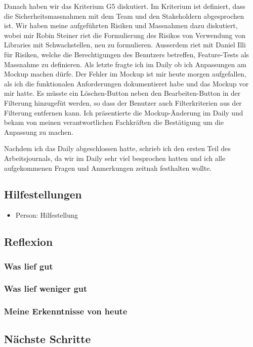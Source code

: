 Danach haben wir das Kriterium G5 diskutiert. Im Kriterium ist definiert, dass die Sicherheitsmassnahmen mit dem Team und den Stakeholdern
abgesprochen ist. Wir haben meine aufgeführten Risiken und Massnahmen dazu diskutiert, wobei mir Robin Steiner riet die Formulierung des Risikos von
Verwendung von Libraries mit Schwachstellen, neu zu formulieren. Ausserdem riet mit Daniel Illi für Risiken, welche die Berechtigungen des Benutzers betreffen,
Feature-Tests als Massnahme zu definieren. Als letzte fragte ich im Daily ob ich Anpassungen am Mockup machen dürfe. Der Fehler im Mockup ist mir heute morgen aufgefallen, 
als ich die funktionalen Anforderungen dokumentieret habe und das Mockup vor mir hatte. Es müsste ein Löschen-Button neben den Bearbeiten-Button in der Filterung hinzugefüt werden,
so dass der Benutzer auch Filterkriterien aus der Filterung entfernen kann. Ich präsentierte die Mockup-Änderung im Daily und bekam von meinen verantwortlichen Fachkräften
die Bestätigung um die Anpassung zu machen. 

Nachdem ich das Daily abgeschlossen hatte, schrieb ich den ersten Teil des Arbeitsjournals, da wir im Daily sehr viel besprochen hatten und ich
alle aufgekommenen Fragen und Anmerkungen zeitnah festhalten wollte.

\subsection*{Hilfestellungen}
\begin{itemize}
    \item Person: Hilfestellung
\end{itemize}

\subsection*{Reflexion}

\subsubsection*{Was lief gut}

\subsubsection*{Was lief weniger gut}

\subsubsection*{Meine Erkenntnisse von heute}

\subsection*{Nächste Schritte}

\pagebreak
